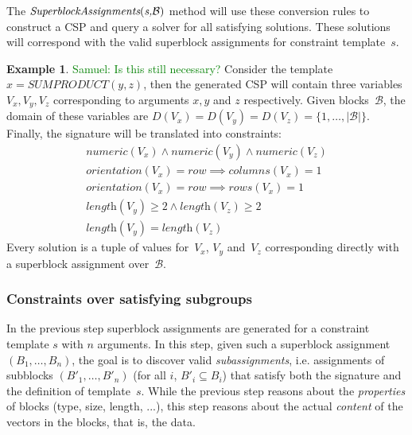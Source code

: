 \documentclass{IEEEtran}
\newcommand{\samuel}[1]{\textcolor{green}{{\sc Samuel:} #1}\xspace}
\newcommand{\format}[1]{\textit{#1}\xspace}
\newcommand{\generategroups}{\format{SuperblockAssignments}}
\newcommand{\blocks}{\ensuremath{\mathcal{B}}\xspace}
\newcommand{\eccalc}[2]{\ensuremath{#1 = #2}}
\newcommand{\ecsumprod}[3]{\eccalc{#1}{\textit{SUMPRODUCT}(#2, #3)}}
\newcommand{\numeric}{\format{numeric}}
\newcommand{\plength}{\format{length}}
\newcommand{\por}{\format{orientation}}
\newcommand{\prows}{\format{rows}}
\newcommand{\pcols}{\format{columns}}
\theoremstyle{definition}
\newtheorem{example}{Example}
\begin{document}
The $\generategroups(\textit{s,\blocks})$ method will use these conversion rules to construct a CSP and query a solver for all satisfying solutions.
These solutions will correspond with the valid superblock assignments for constraint template~$s$.

\begin{example}
  \samuel{Is this still necessary?}
  Consider the template $\ecsumprod{x}{y}{z}$, then the generated CSP will contain three variables $V_x, V_y, V_z$ corresponding to arguments $x, y$ and $z$ respectively.
  Given blocks~\blocks, the domain of these variables are $D(V_x) = D(V_y) = D(V_z) = \{ 1, \dots, |\blocks| \}$.
  Finally, the signature will be translated into constraints:
  \begin{align*}
    & \numeric(V_x) \land \numeric(V_y) \land \numeric(V_z) \\
    & \por(V_x) = \mathit{row} \implies \pcols(V_x) = 1 \\
    & \por(V_x) = \mathit{row} \implies \prows(V_x) = 1 & \\
    & \plength(V_y) \geq 2 \land \plength(V_z) \geq 2 \\
    & \plength(V_y) = \plength(V_z)
  \end{align*}
  Every solution is a tuple of values for~$V_x$, $V_y$ and~$V_z$ corresponding directly with a superblock assignment over~\blocks.
\end{example}





\subsubsection{Constraints over satisfying subgroups}
\label{sec:algo:subgr}
In the previous step superblock assignments are generated for a constraint template $s$ with $n$ arguments.
In this step, given such a superblock assignment $(B_1, \dots, B_n)$, the goal is to discover valid \textit{subassignments}, i.e. assignments of subblocks $(B'_1, \dots, B'_n)$ (for all $i$, $B'_i \subseteq B_i$) that satisfy both the signature and the definition of template~$s$.
While the previous step reasons about the \textit{properties} of blocks (type, size, length, ...), this step reasons about the actual \textit{content} of the vectors in the blocks, that is, the data.
\end{document}
